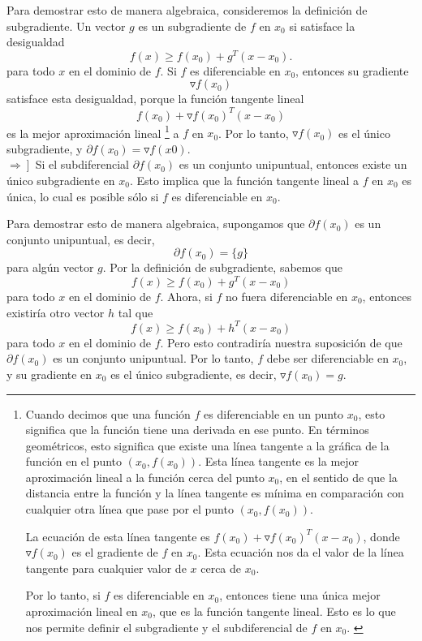 \begin{enumerate}
\begin{enumerate}[\bfseries (a)]
		Para demostrar esto de manera algebraica, consideremos la definición de subgradiente. Un vector $g$ es un subgradiente de $f$ en $x_0$ si satisface la desigualdad 
		$$f(x) \geq f(x_0) + g^T (x - x_0).$$ 
		para todo $x$ en el dominio de $f$. Si $f$ es diferenciable en $x_0$, entonces su gradiente 
		$$\triangledown f(x_0)$$
		satisface esta desigualdad, porque la función tangente lineal 
		$$f(x_0) + \triangledown f(x_0)^T (x - x_0)$$ 
		es la mejor aproximación lineal
		\footnote{
		    Cuando decimos que una función $f$ es diferenciable en un punto $x_0$, esto significa que la función tiene una derivada en ese punto. En términos geométricos, esto significa que existe una línea tangente a la gráfica de la función en el punto $(x_0, f(x_0))$. Esta línea tangente es la mejor aproximación lineal a la función cerca del punto $x_0$, en el sentido de que la distancia entre la función y la línea tangente es mínima en comparación con cualquier otra línea que pase por el punto $(x_0, f(x_0))$.

		    La ecuación de esta línea tangente es $f(x_0) + \triangledown f(x_0)^T (x - x_0)$, donde $\triangledown f(x_0)$ es el gradiente de $f$ en $x_0$. Esta ecuación nos da el valor de la línea tangente para cualquier valor de $x$ cerca de $x_0$.

		    Por lo tanto, si $f$ es diferenciable en $x_0$, entonces tiene una única mejor aproximación lineal en $x_0$, que es la función tangente lineal. Esto es lo que nos permite definir el subgradiente y el subdiferencial de $f$ en $x_0$.
		\label{diferenciable}}
		a $f$ en $x_0$. Por lo tanto, $\triangledown f(x_0)$ es el único subgradiente, y $\partial f(x_0) = {\triangledown f(x0)}$.\\

		$\left.\Rightarrow\right]$ Si el subdiferencial $\partial f(x_0)$ es un conjunto unipuntual, entonces existe un único subgradiente en $x_0$. Esto implica que la función tangente lineal a $f$ en $x_0$ es única, lo cual es posible sólo si $f$ es diferenciable en $x_0$.

		Para demostrar esto de manera algebraica, supongamos que $\partial f(x_0)$ es un conjunto unipuntual, es decir, 
		$$\partial f(x_0) = \{g\}$$ para algún vector $g$. Por la definición de subgradiente, sabemos que 
		$$f(x) \geq f(x_0) + g^T (x - x_0)$$ 
		para todo $x$ en el dominio de $f$. Ahora, si $f$ no fuera diferenciable en $x_0$, entonces existiría otro vector $h$ tal que 
		$$f(x) \geq f(x_0) + h^T (x - x_0)$$
		para todo $x$ en el dominio de $f$. Pero esto contradiría nuestra suposición de que $\partial f(x_0)$ es un conjunto unipuntual. Por lo tanto, $f$ debe ser diferenciable en $x_0$, y su gradiente en $x_0$ es el único subgradiente, es decir, $\triangledown f(x_0) = g$.\\


\end{enumerate}
\end{enumerate}
